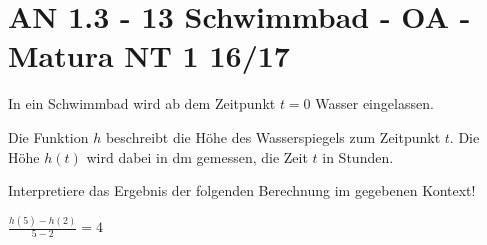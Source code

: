\section{AN 1.3 - 13 Schwimmbad - OA - Matura NT 1 16/17}

\begin{beispiel}[AN 1.3]{1} %
In ein Schwimmbad wird ab dem Zeitpunkt $t=0$ Wasser eingelassen.

Die Funktion $h$ beschreibt die Höhe des Wasserspiegels zum Zeitpunkt $t$. Die Höhe $h(t)$ wird dabei in dm gemessen, die Zeit $t$ in Stunden.

Interpretiere das Ergebnis der folgenden Berechnung im gegebenen Kontext!

$\frac{h(5)-h(2)}{5-2}=4$\leer

\end{beispiel}